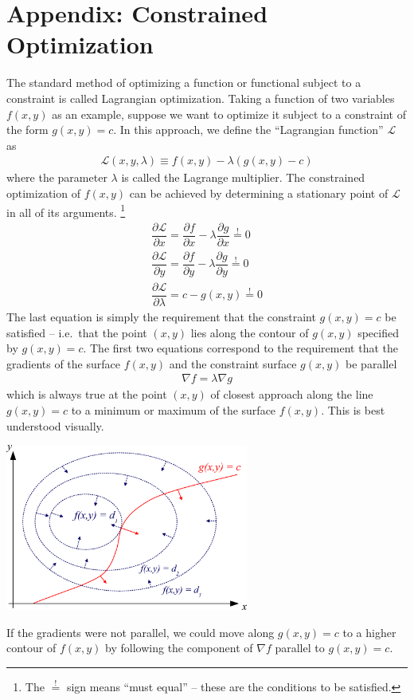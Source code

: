\documentclass[11pt]{article}
\newcommand{\la}{\ensuremath{\lambda}}
\newcommand{\mc}[1]{\ensuremath{\mathcal{#1}}}
\newcommand{\pd}[2]{\ensuremath{\dfrac{\partial#1}{\partial #2}}}
\theoremstyle{indented}
\begin{document}
\section{Appendix: Constrained Optimization}
\label{constrained-optimization}
The standard method of optimizing a function or functional subject to a constraint is called Lagrangian optimization.
Taking a function of two variables $f(x,y)$ as an example, suppose we want to optimize it subject to a constraint of the form $g(x,y)=c$.
In this approach, we define the ``Lagrangian function'' $\mc{L}$ as
\begin{align*}
	\mc{L}(x,y,\la)
\equiv
	f(x,y)
-
	\la(g(x,y)-c)
\end{align*}
where the parameter $\la$ is called the Lagrange multiplier.
The constrained optimization of $f(x,y)$ can be achieved by determining a stationary point of $\mc{L}$ in all of its arguments. \footnote{The $\overset{!}=$ sign means ``must equal'' -- these are the conditions to be satisfied.}
\begin{align*}
	\pd{\mc{L}}{x}
=
	\pd{f}{x}
-
	\la\pd{g}{x}
\overset{!}=0
\\
	\pd{\mc{L}}{y}
=
	\pd{f}{y}
-
	\la\pd{g}{y}
\overset{!}=0
\\
	\pd{\mc{L}}{\la}
=
	c
-
	g(x,y)
\overset{!}=0
\end{align*}
The last equation is simply the requirement that the constraint $g(x,y)=c$ be satisfied -- i.e.\ that the point $(x,y)$ lies along the contour of $g(x,y)$ specified by $g(x,y)=c$.
The first two equations correspond to the requirement that the gradients of the surface $f(x,y)$ and the constraint surface $g(x,y)$ be parallel
\begin{align}
	\nabla f
=
	\la\nabla g
\end{align}
which is always true at the point $(x,y)$ of closest approach along the line $g(x,y)=c$ to a minimum or maximum of the surface $f(x,y)$.
This is best understood visually.
\begin{center}
	\includegraphics[width=0.6\textwidth]{figs/LagrangeMultipliers2D.pdf}
\end{center}
If the gradients were not parallel, we could move along $g(x,y)=c$ to a higher contour of $f(x,y)$ by following the component of $\nabla f$ parallel to $g(x,y)=c$.
\end{document}
